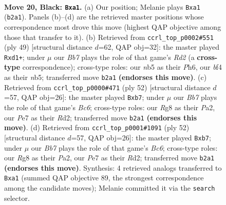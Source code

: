\documentclass[11pt]{article}
\begin{document}
\clearpage

\begin{figure}[p]\centering
\begin{subfigure}{0.46\textwidth}\centering
\resizebox{\linewidth}{!}{%
\newchessgame
\chessboard[
  setfen={2k3r1/1ppnp2p/2n3p1/pN6/5B1P/5P2/PbP1KP2/R5R1 b - - 1 20},
  showmover=false,
  pgfstyle=straightmove, color=movearrow, markmove={b2-a1}
]}
\caption{}
\end{subfigure}\hfill
\begin{subfigure}{0.46\textwidth}\centering
\resizebox{\linewidth}{!}{%
\newchessgame
\chessboard[
  setfen={r4k2/p2r1pp1/1p3n1p/1N2p3/1P6/6P1/1P2PP1P/R2R2K1 b - - 2 25},
  showmover=false,
  pgfstyle=straightmove, color=movearrow, markmove={d7-d1}
]}
\caption{}
\end{subfigure}
\\[4pt]
\begin{subfigure}{0.46\textwidth}\centering
\resizebox{\linewidth}{!}{%
\newchessgame
\chessboard[
  setfen={1r4k1/1r3p1p/p1B2bp1/8/8/5N1P/PP1R1PP1/6K1 w - - 1 27},
  showmover=false,
  pgfstyle=straightmove, color=movearrow, markmove={c6-b7}
]}
\caption{}
\end{subfigure}\hfill
\begin{subfigure}{0.46\textwidth}\centering
\resizebox{\linewidth}{!}{%
\newchessgame
\chessboard[
  setfen={1r4k1/1r3p1p/p1B2bp1/8/8/5N1P/PP1R1PP1/6K1 w - - 1 27},
  showmover=false,
  pgfstyle=straightmove, color=movearrow, markmove={c6-b7}
]}
\caption{}
\end{subfigure}
\caption{\textbf{Move 20, Black: \texttt{Bxa1}.} (a) Our position; Melanie plays \texttt{Bxa1} (\texttt{b2a1}). Panels (b)--(d) are the retrieved master positions whose correspondence most drove this move (highest QAP objective among those that transfer to it). (b) Retrieved from \texttt{ccrl\_top\_p0002\#551} (ply 49) [structural distance $d$=62, QAP obj=32]: the master played \texttt{Rxd1+}; under $\mu$ our \emph{Bb7} plays the role of that game's \emph{Rd2} (a \textbf{cross-type} correspondence); cross-type roles: our \emph{n}b5 as their \emph{P}h6, our \emph{b}f4 as their \emph{n}b5; transferred move \texttt{b2a1} \textbf{(endorses this move)}. (c) Retrieved from \texttt{ccrl\_top\_p0000\#471} (ply 52) [structural distance $d$=57, QAP obj=26]: the master played \texttt{Bxb7}; under $\mu$ our \emph{Bb7} plays the role of that game's \emph{Bc6}; cross-type roles: our \emph{R}g8 as their \emph{P}a2, our \emph{P}e7 as their \emph{R}d2; transferred move \texttt{b2a1} \textbf{(endorses this move)}. (d) Retrieved from \texttt{ccrl\_top\_p0001\#1091} (ply 52) [structural distance $d$=57, QAP obj=26]: the master played \texttt{Bxb7}; under $\mu$ our \emph{Bb7} plays the role of that game's \emph{Bc6}; cross-type roles: our \emph{R}g8 as their \emph{P}a2, our \emph{P}e7 as their \emph{R}d2; transferred move \texttt{b2a1} \textbf{(endorses this move)}. Synthesis: 4 retrieved analogs transferred to \texttt{Bxa1} (summed QAP objective 89, the strongest correspondence among the candidate moves); Melanie committed it via the \texttt{search} selector.}
\label{fig:thought-m39}
\end{figure}
\end{document}
